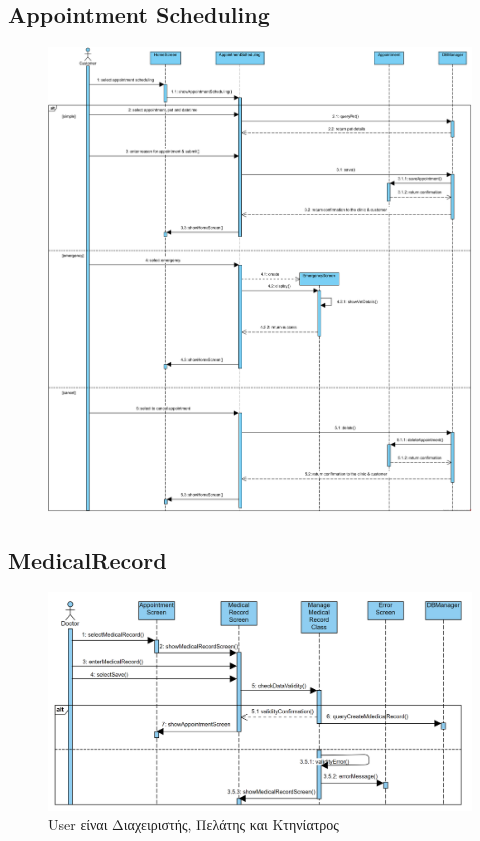 \documentclass[12pt,a4paper,twoside]{book}
\begin{document}
\subsection{Appointment Scheduling}
\begin{figure}[H]
    \centering
    \includegraphics[width=\textwidth]{Resources/Sequence Diagram/appointment-scheduling_sequence.png}\label{fig:sequence-appointment-scheduling}
\end{figure}

\subsection{MedicalRecord}
\begin{figure}[H]
    \centering
    \includegraphics[width=\textwidth]{Resources/Sequence Diagram/MedicalRecord_Sequence.png}
    \caption{User είναι Διαχειριστής, Πελάτης και Κτηνίατρος}\label{fig:sequence-medical-record}
\end{figure}
\end{document}
